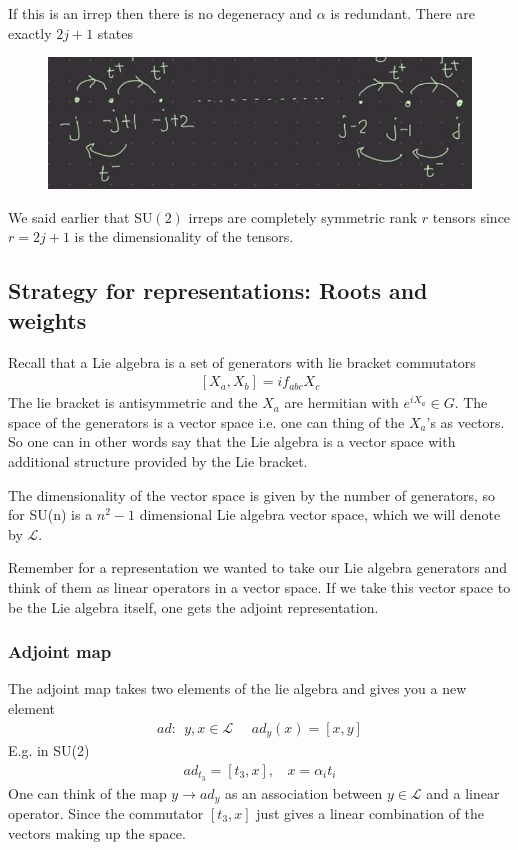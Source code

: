 \documentclass[a4paper,12pt]{article}
\begin{document}
If this is an irrep then there is no degeneracy and $\alpha$ is redundant. There are exactly $2j+1$ states
\begin{figure}[H]
	\centering
	\includegraphics[width=0.6\linewidth]{24}
	\caption{}
	\label{fig:4}
\end{figure}
We said earlier that SU$(2)$ irreps are completely symmetric rank $r$ tensors since $r=2j+1$ is the dimensionality of the tensors.
\subsection{Strategy for representations: Roots and weights}
Recall that a Lie algebra is a set of generators with lie bracket commutators
\begin{equation}
	\begin{aligned}
		\left[X_a,X_b\right]=if_{abc}X_c
	\end{aligned}
\end{equation}
The lie bracket is antisymmetric and the $X_a$ are hermitian with $e^{iX_a}\in G$. The space of the generators is a vector space i.e. one can thing of the $X_a$'s as vectors. So one can in other words say that the Lie algebra is a vector space with additional structure provided by the Lie bracket.

The dimensionality of the vector space is given by the number of generators, so for SU(n) is a $n^2-1$ dimensional Lie algebra vector space, which we will denote by $\mathcal{L}$.

Remember for a representation we wanted to take our Lie algebra generators and think of them as linear operators in a vector space. If we take this vector space to be the Lie algebra itself, one gets the adjoint representation.
\subsubsection{Adjoint map}
The adjoint map takes two elements of the lie algebra and gives you a new element
\begin{equation}
	\begin{aligned}
		ad:~~y,x\in \mathcal{L}~~~~~~ad_y(x)=[x,y]
	\end{aligned}
\end{equation}
E.g. in SU(2)
\begin{equation}
	\begin{aligned}
		ad_{t_3}=[t_3,x], ~~~~x=\alpha_i t_i
	\end{aligned}
\end{equation}
One can think of the map $y\to ad_y$ as an association between $y\in \mathcal{L}$ and a linear operator. Since the commutator $[t_3,x]$ just gives a linear combination of the vectors making up the space.
\end{document}

